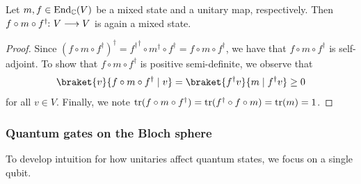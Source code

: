 \documentclass[a4paper, oneside, 12pt]{amsart}
\begin{document}
\begin{lemma}\label{lem:mixed-state-action}
  Let \(m, f\in \operatorname{End}_{ \mathbb{C}}(V)\) be a mixed state and a unitary map, respectively.
  Then \(f\circ m\circ f^{\dagger} \from V \to V\) is again a mixed state.
\end{lemma}
\begin{proof}
  Since \((f\circ m\circ f^{\dagger})^{\dagger} = {f^{\dagger}}^{\dagger}\circ m^{\dagger}\circ f^{\dagger} = f\circ  m\circ f^{\dagger}\), we have that \(f \circ m \circ f^{\dagger}\) is self-adjoint.
  To show that \(f \circ m \circ f^{\dagger}\) is positive semi-definite, we observe that
  \begin{equation*}
    \braket{v}{f \circ m \circ f^{\dagger} \mid v} = \braket{f^{\dagger } v}{m \mid f^{\dagger} v} \geq 0
  \end{equation*}
  for all \(v\in V\).
  Finally, we note  \(\operatorname{tr}(f \circ m \circ f^{\dagger}) = \operatorname{tr}(f^{\dagger} \circ f\circ m ) = \operatorname{tr}(m) = 1\).
\end{proof}

\subsubsection{Quantum gates on the Bloch sphere}\label{sec:quantum-gates-on-the-bloch-sphere}
To develop intuition for how unitaries affect quantum states, we focus on a single qubit.
\end{document}
